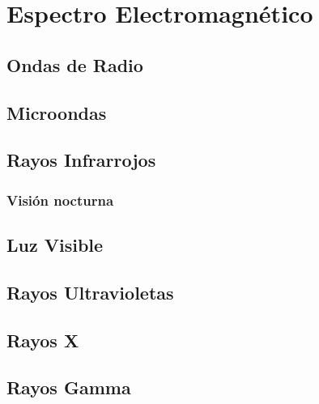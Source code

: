 \chapter{Espectro Electromagnético}\label{lbl-espectroElectromagnetico}

\section{Ondas de Radio}

\section{Microondas}

\section{Rayos Infrarrojos}

\subsection{Visión nocturna}

\section{Luz Visible}

\section{Rayos Ultravioletas}

\section{Rayos X}

\section{Rayos Gamma}

